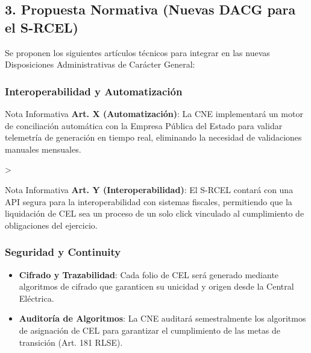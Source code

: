\documentclass{cel}
\begin{document}
\subsection{3. Propuesta Normativa (Nuevas DACG para el S-RCEL)}
\nopagebreak

Se proponen los siguientes artículos técnicos para integrar en las nuevas Disposiciones Administrativas de Carácter General:


\subsubsection{Interoperabilidad y Automatización}
\nopagebreak

\vspace{0.2cm}
\begin{glowBox}[gobmxDorado]{Nota Informativa}
\textbf{Art. X (Automatización)}: La CNE implementará un motor de conciliación automática con la Empresa Pública del Estado para validar telemetría de generación en tiempo real, eliminando la necesidad de validaciones manuales mensuales.
\end{glowBox}
\textgreater{}

\vspace{0.2cm}
\begin{glowBox}[gobmxDorado]{Nota Informativa}
\textbf{Art. Y (Interoperabilidad)}: El S-RCEL contará con una API segura para la interoperabilidad con sistemas fiscales, permitiendo que la liquidación de CEL sea un proceso de \textquotedbl{}un solo click\textquotedbl{} vinculado al cumplimiento de obligaciones del ejercicio.
\end{glowBox}

\subsubsection{Seguridad y Continuity}
\nopagebreak

\begin{itemize}
\item \textbf{Cifrado y Trazabilidad}: Cada folio de CEL será generado mediante algoritmos de cifrado que garanticen su unicidad y origen desde la Central Eléctrica.
\item \textbf{Auditoría de Algoritmos}: La CNE auditará semestralmente los algoritmos de asignación de CEL para garantizar el cumplimiento de las metas de transición (Art. 181 RLSE).


\end{itemize}
\end{document}

